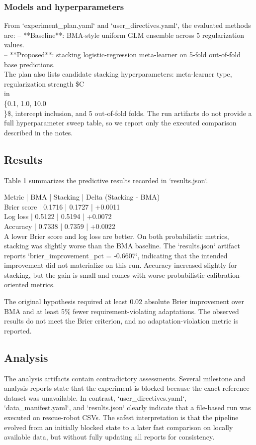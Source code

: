 \documentclass[11pt,a4paper]{article}
\begin{document}
\subsubsection{Models and hyperparameters}
From `experiment\_plan.yaml` and `user\_directives.yaml`, the evaluated methods are:
\noindent -- **Baseline**: BMA-style uniform GLM ensemble across 5 regularization values.\\
\noindent -- **Proposed**: stacking logistic-regression meta-learner on 5-fold out-of-fold base predictions.\\

The plan also lists candidate stacking hyperparameters: meta-learner type, regularization strength \$C \\in \\\{0.1, 1.0, 10.0\\\}\$, intercept inclusion, and 5 out-of-fold folds. The run artifacts do not provide a full hyperparameter sweep table, so we report only the executed comparison described in the notes.


\subsection{Results}
Table 1 summarizes the predictive results recorded in `results.json`.

Metric | BMA | Stacking | Delta (Stacking - BMA)\\
Brier score | 0.1716 | 0.1727 | +0.0011\\
Log loss | 0.5122 | 0.5194 | +0.0072\\
Accuracy | 0.7338 | 0.7359 | +0.0022\\

A lower Brier score and log loss are better. On both probabilistic metrics, stacking was slightly worse than the BMA baseline. The `results.json` artifact reports `brier\_improvement\_pct = -0.6607`, indicating that the intended improvement did not materialize on this run. Accuracy increased slightly for stacking, but the gain is small and comes with worse probabilistic calibration-oriented metrics.

The original hypothesis required at least 0.02 absolute Brier improvement over BMA and at least 5\% fewer requirement-violating adaptations. The observed results do not meet the Brier criterion, and no adaptation-violation metric is reported.


\subsection{Analysis}
The analysis artifacts contain contradictory assessments. Several milestone and analysis reports state that the experiment is blocked because the exact reference dataset was unavailable. In contrast, `user\_directives.yaml`, `data\_manifest.yaml`, and `results.json` clearly indicate that a file-based run was executed on rescue-robot CSVs. The safest interpretation is that the pipeline evolved from an initially blocked state to a later fast comparison on locally available data, but without fully updating all reports for consistency.
\end{document}
